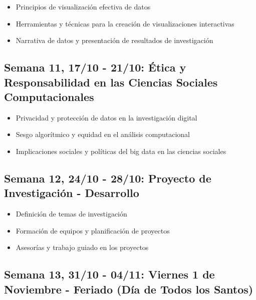 \documentclass[11pt,letter,]{article}
\providecommand{\tightlist}{%
  \setlength{\itemsep}{0pt}\setlength{\parskip}{0pt}}
\begin{document}
\begin{itemize}
\tightlist
\item
  Principios de visualización efectiva de datos
\item
  Herramientas y técnicas para la creación de visualizaciones
  interactivas
\item
  Narrativa de datos y presentación de resultados de investigación
\end{itemize}

\hypertarget{semana-11-1710---2110-uxe9tica-y-responsabilidad-en-las-ciencias-sociales-computacionales}{%
\subsection{Semana 11, 17/10 - 21/10: Ética y Responsabilidad en las
Ciencias Sociales
Computacionales}\label{semana-11-1710---2110-uxe9tica-y-responsabilidad-en-las-ciencias-sociales-computacionales}}

\begin{itemize}
\tightlist
\item
  Privacidad y protección de datos en la investigación digital
\item
  Sesgo algorítmico y equidad en el análisis computacional
\item
  Implicaciones sociales y políticas del big data en las ciencias
  sociales
\end{itemize}

\hypertarget{semana-12-2410---2810-proyecto-de-investigaciuxf3n---desarrollo}{%
\subsection{Semana 12, 24/10 - 28/10: Proyecto de Investigación -
Desarrollo}\label{semana-12-2410---2810-proyecto-de-investigaciuxf3n---desarrollo}}

\begin{itemize}
\tightlist
\item
  Definición de temas de investigación
\item
  Formación de equipos y planificación de proyectos
\item
  Asesorías y trabajo guiado en los proyectos
\end{itemize}

\hypertarget{semana-13-3110---0411-viernes-1-de-noviembre---feriado-duxeda-de-todos-los-santos}{%
\subsection{Semana 13, 31/10 - 04/11: Viernes 1 de Noviembre - Feriado
(Día de Todos los
Santos)}\label{semana-13-3110---0411-viernes-1-de-noviembre---feriado-duxeda-de-todos-los-santos}}
\end{document}
